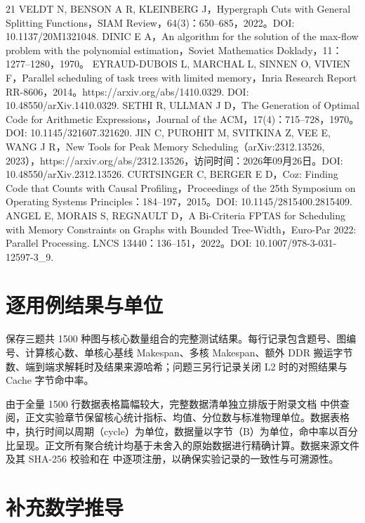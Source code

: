 \documentclass[anonymous,withtoc]{gmcm2026}
\begin{document}
\begin{thebibliography}{21}
 VELDT N, BENSON A R, KLEINBERG J，Hypergraph Cuts with General Splitting Functions，SIAM Review，64(3)：650--685，2022。DOI: 10.1137/20M1321048.
 DINIC E A，An algorithm for the solution of the max-flow problem with the polynomial estimation，Soviet Mathematics Doklady，11：1277--1280，1970。
 EYRAUD-DUBOIS L, MARCHAL L, SINNEN O, VIVIEN F，Parallel scheduling of task trees with limited memory，Inria Research Report RR-8606，2014。https://arxiv.org/abs/1410.0329. DOI: 10.48550/arXiv.1410.0329.
 SETHI R, ULLMAN J D，The Generation of Optimal Code for Arithmetic Expressions，Journal of the ACM，17(4)：715--728，1970。DOI: 10.1145/321607.321620.
 JIN C, PUROHIT M, SVITKINA Z, VEE E, WANG J R，New Tools for Peak Memory Scheduling（arXiv:2312.13526, 2023），https://arxiv.org/abs/2312.13526，访问时间：2026年09月26日。DOI: 10.48550/arXiv.2312.13526.
 CURTSINGER C, BERGER E D，Coz: Finding Code that Counts with Causal Profiling，Proceedings of the 25th Symposium on Operating Systems Principles：184--197，2015。DOI: 10.1145/2815400.2815409.
 ANGEL E, MORAIS S, REGNAULT D，A Bi-Criteria FPTAS for Scheduling with Memory Constraints on Graphs with Bounded Tree-Width，Euro-Par 2022: Parallel Processing. LNCS 13440：136--151，2022。DOI: 10.1007/978-3-031-12597-3\_9.
\end{thebibliography}

\appendix
\section{逐用例结果与单位}

\texttt{} 保存三题共 1500 种图与核心数量组合的完整测试结果。每行记录包含题号、图编号、计算核心数、单核心基线 Makespan、多核 Makespan、额外 DDR 搬运字节数、端到端求解耗时及结果来源哈希；问题三另行记录关闭 L2 时的对照结果与 Cache 字节命中率。

由于全量 1500 行数据表格篇幅较大，完整数据清单独立排版于附录文档 \texttt{} 中供查阅，正文实验章节保留核心统计指标、均值、分位数与标准物理单位。数据表格中，执行时间以周期（cycle）为单位，数据量以字节（B）为单位，命中率以百分比呈现。正文所有聚合统计均基于未舍入的原始数据进行精确计算。数据来源文件及其 SHA-256 校验和在 \texttt{} 中逐项注册，以确保实验记录的一致性与可溯源性。

\section{补充数学推导}
\end{document}
